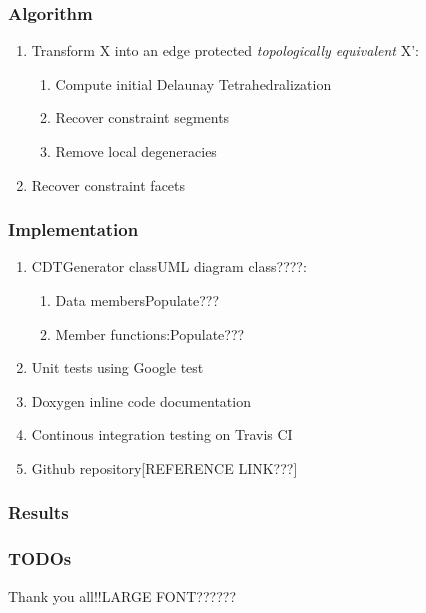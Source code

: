 \documentclass{beamer}
\begin{document}
	\begin{frame}
		\frametitle{Algorithm} 
			\begin{enumerate}
				\item Transform X into an edge protected \textit{topologically equivalent} X':	
				\begin{enumerate}
					\item Compute initial Delaunay Tetrahedralization	
					\item Recover constraint segments
					\item Remove local degeneracies
				\end{enumerate}
				\item Recover constraint facets
			\end{enumerate}		
	\end{frame}
	\begin{frame}
		\frametitle{Implementation}
			\begin{enumerate}
				\item CDTGenerator class{UML diagram class????}:
					\begin{enumerate}
						\item Data members{Populate???}
						\item Member functions:{Populate???}	
					\end{enumerate}		
				\item Unit tests using Google test
				\item Doxygen inline code documentation
				\item Continous integration testing on Travis CI	
				\item Github repository[REFERENCE LINK???]	
			\end{enumerate}
	\end{frame}	
	\begin{frame}
		\frametitle{Results} 	
	\end{frame}	
	\begin{frame}
		\frametitle{TODOs}	
	\end{frame}	
	\begin{frame}
		Thank you all!!{LARGE FONT??????}
	\end{frame}	
\end{document}
